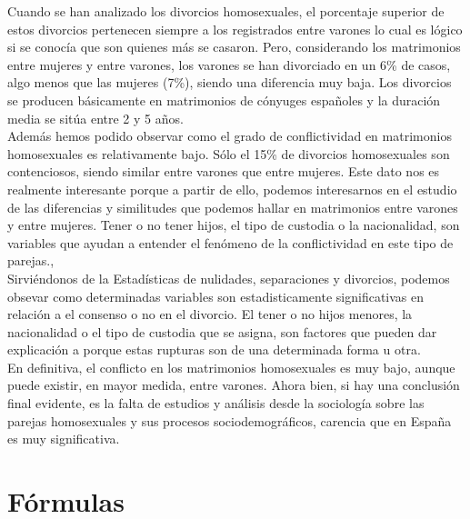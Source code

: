 \documentclass{article}
\begin{document}
Cuando se han analizado los divorcios homosexuales, el porcentaje superior de estos
divorcios pertenecen siempre a los registrados entre varones lo cual es lógico si se
conocía que son quienes más se casaron. Pero, considerando los matrimonios entre
mujeres y entre varones, los varones se han divorciado en un 6\% de casos, algo menos
que las mujeres (7\%), siendo una diferencia muy baja. Los divorcios se producen
básicamente en matrimonios de cónyuges españoles y la duración media se sitúa entre 2
y 5 años\cite{gartrell2011family}.\\

Además hemos podido observar como el grado de conflictividad en matrimonios
homosexuales es relativamente bajo. Sólo el 15\% de divorcios homosexuales son
contenciosos, siendo similar entre varones que entre mujeres. Este dato nos es realmente
interesante porque a partir de ello, podemos interesarnos en el estudio de las diferencias
y similitudes que podemos hallar en matrimonios entre varones y entre mujeres. Tener o
no tener hijos, el tipo de custodia o la nacionalidad, son variables que ayudan a entender
el fenómeno de la conflictividad en este tipo de parejas.,\\

Sirviéndonos de la Estadísticas de nulidades, separaciones y divorcios, podemos
obsevar como determinadas variables son estadisticamente significativas en relación a el
consenso o no en el divorcio. El tener o no hijos menores, la nacionalidad o el tipo de
custodia que se asigna, son factores que pueden dar explicación a porque estas rupturas
son de una determinada forma u otra.\\

En definitiva, el conflicto en los matrimonios homosexuales es muy bajo, aunque puede
existir, en mayor medida, entre varones. Ahora bien, si hay una conclusión final
evidente, es la falta de estudios y análisis desde la sociología sobre las parejas
homosexuales y sus procesos sociodemográficos, carencia que en España es muy
significativa.

\section{Fórmulas}



\end{document}
